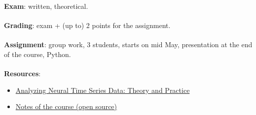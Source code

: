 \textbf{Exam}: written, theoretical.\\ \\
\textbf{Grading}: exam + (up to) 2 points for the assignment.\\ \\
\textbf{Assignment}: group work, 3 students, starts on mid May, presentation at the end of the course, Python.\\ \\

\textbf{Resources}: 
\begin{itemize}
    \item \href{https://direct.mit.edu/books/monograph/4013/Analyzing-Neural-Time-Series-DataTheory-and}{Analyzing Neural Time Series Data: Theory and Practice}
    \item \href{https://github.com/FrancescoNegri/neural-signal-analysis-notes}{Notes of the course (open source)}
\end{itemize}